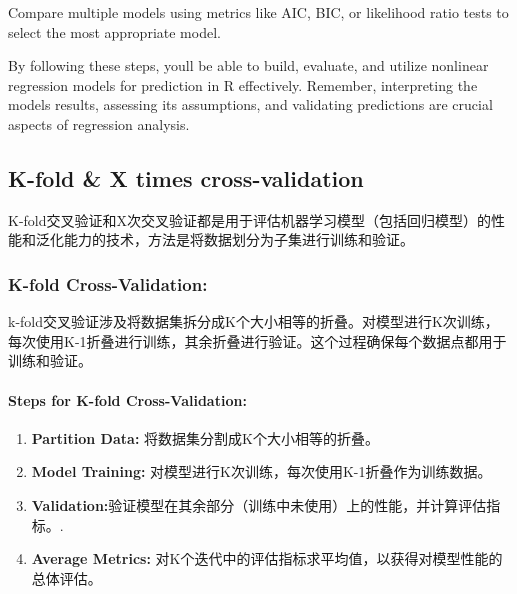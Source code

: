 \documentclass[
]{article}
\begin{document}
Compare multiple models using metrics like AIC, BIC, or likelihood ratio
tests to select the most appropriate model.

By following these steps, you\textquotesingle ll be able to build,
evaluate, and utilize nonlinear regression models for prediction in R
effectively. Remember, interpreting the model\textquotesingle s results,
assessing its assumptions, and validating predictions are crucial
aspects of regression analysis.

\hypertarget{k-fold--x-times-cross-validation}{%
\subsection{\texorpdfstring{\textbf{K-fold} \& \textbf{X times}
cross-validation}{K-fold \& X times cross-validation}}\label{k-fold--x-times-cross-validation}}

K-fold交叉验证和X次交叉验证都是用于评估机器学习模型（包括回归模型）的性能和泛化能力的技术，方法是将数据划分为子集进行训练和验证。

\hypertarget{k-fold-cross-validation}{%
\subsubsection{K-fold Cross-Validation:}\label{k-fold-cross-validation}}

k-fold交叉验证涉及将数据集拆分成K个大小相等的折叠。对模型进行K次训练，每次使用K-1折叠进行训练，其余折叠进行验证。这个过程确保每个数据点都用于训练和验证。

\hypertarget{steps-for-k-fold-cross-validation}{%
\paragraph{Steps for K-fold
Cross-Validation:}\label{steps-for-k-fold-cross-validation}}

\begin{enumerate}
\def\labelenumi{\arabic{enumi}.}
\item
  \textbf{Partition Data:} 将数据集分割成K个大小相等的折叠。
\item
  \textbf{Model Training:}
  对模型进行K次训练，每次使用K-1折叠作为训练数据。
\item
  \textbf{Validation:}验证模型在其余部分（训练中未使用）上的性能，并计算评估指标。.
\item
  \textbf{Average Metrics:}
  对K个迭代中的评估指标求平均值，以获得对模型性能的总体评估。
\end{enumerate}
\end{document}

